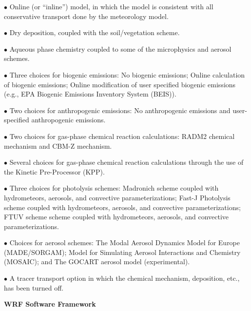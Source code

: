 \begin{description}
\setlength{\itemsep}{-5pt}
\item{$\bullet$} Online (or ``inline'') model, in which the model is consistent
with all conservative transport done by the meteorology model. 
%
\item{$\bullet$} Dry deposition, coupled with the soil/vegetation scheme.
%
\item{$\bullet$} Aqueous phase chemistry coupled to some of the microphysics and aerosol schemes.
%
\item{$\bullet$} Three choices for biogenic emissions:
No biogenic emissions; Online calculation of biogenic emissions; Online modification 
of user specified biogenic emissions (e.g., EPA Biogenic Emissions Inventory System (BEIS)).
%
\item{$\bullet$} Two choices for anthropogenic emissions:
No anthropogenic emissions and user-specified anthropogenic emissions.
%
\item{$\bullet$} Two choices for gas-phase chemical reaction calculations:
RADM2 chemical mechanism and CBM-Z mechanism.
%
\item{$\bullet$} Several choices for gas-phase chemical reaction calculations 
through the use of the Kinetic Pre-Processor (KPP). 
%
\item{$\bullet$} Three choices for photolysis schemes:
Madronich scheme coupled with hydrometeors, aerosols, and convective parameterizations;
Fast-J Photolysis scheme coupled with hydrometeors, aerosols, and convective parameterizations;
FTUV scheme scheme coupled with hydrometeors, aerosols, and convective parameterizations.
%
\item{$\bullet$} Choices for aerosol schemes:
The Modal Aerosol Dynamics Model for Europe (MADE/SORGAM);
Model for Simulating Aerosol Interactions and Chemistry (MOSAIC); and 
The GOCART aerosol model (experimental). 
%
\item{$\bullet$} A tracer transport option in which the chemical mechanism, 
deposition, etc., has been turned off. 
\end{description}

\vskip 12pt
{\noindent\bf WRF Software Framework}
\vskip 12pt

